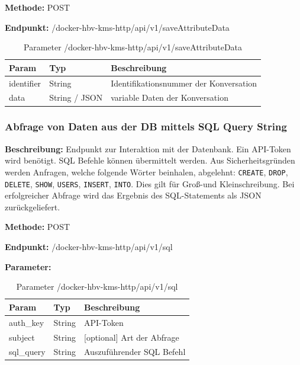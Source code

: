 \textbf{Methode:} POST

\textbf{Endpunkt:} /docker-hbv-kms-http/api/v1/saveAttributeData

\begin{table}[H]
    \label{table:/docker-hbv-kms-http/api/v1/saveAttributeData}
    \caption{Parameter /docker-hbv-kms-http/api/v1/saveAttributeData}
    \setlength{\tabcolsep}{3pt}
    \begin{tabular}{p{100pt}p{80pt}p{200pt}}
        \toprule
        Param      & Typ           & Beschreibung                           \\
        \midrule
        identifier & String        & Identifikationsnummer der Konversation \\
        data       & String / JSON & variable Daten der Konversation        \\
        \bottomrule
    \end{tabular}
\end{table}
\dotfill



\subsubsection{Abfrage von Daten aus der DB mittels SQL Query String}
\label{sec:api-sql-query}
\textbf{Beschreibung:} Endpunkt zur Interaktion mit der Datenbank. Ein API-Token wird benötigt. SQL Befehle können übermittelt werden. Aus Sicherheitsgründen werden Anfragen, welche folgende Wörter beinhalen, abgelehnt: \verb|CREATE|, \verb|DROP|, \verb|DELETE|, \verb|SHOW|, \verb|USERS|, \verb|INSERT|, \verb|INTO|. Dies gilt für Groß-und Kleinschreibung. Bei erfolgreicher Abfrage wird das Ergebnis des SQL-Statements als JSON zurückgeliefert.

\textbf{Methode:} POST

\textbf{Endpunkt:} /docker-hbv-kms-http/api/v1/sql

\textbf{Parameter:}
\begin{table}[H]
    \label{table:/docker-hbv-kms-http/api/v1/sql}
    \caption{Parameter /docker-hbv-kms-http/api/v1/sql}
    \setlength{\tabcolsep}{3pt}
    \begin{tabular}{p{100pt}p{80pt}p{200pt}}
        \toprule
        Param      & Typ    & Beschreibung               \\
        \midrule
        auth\_key  & String & API-Token                  \\
        subject    & String & [optional] Art der Abfrage \\
        sql\_query & String & Auszuführender SQL Befehl  \\
        \bottomrule
    \end{tabular}
\end{table}
\dotfill

